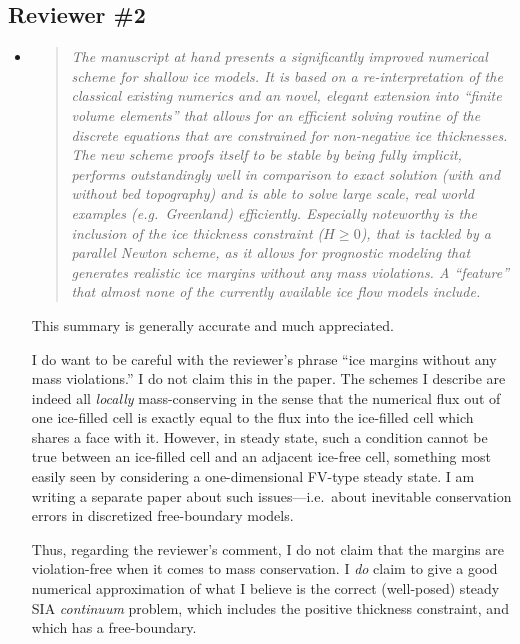 \documentclass[11pt,reqno]{amsart}
\newcommand{\reply}[2]{
\medskip\medskip
\item  \begin{quote}
\emph{#1}
\end{quote}

\medskip
\noindent #2}
\begin{document}
\subsection*{Reviewer \#2}  \begin{itemize}
\reply{The manuscript at hand presents a significantly improved numerical scheme for shallow ice models. It is based on a re-interpretation of the classical existing numerics and an novel, elegant extension into ``finite volume elements'' that allows for an efficient solving routine of the discrete equations that are constrained for non-negative ice thicknesses. The new scheme proofs itself to be stable by being fully implicit, performs outstandingly well in comparison to exact solution (with and without bed topography) and is able to solve large scale, real world examples (e.g.~Greenland) efficiently. Especially noteworthy is the inclusion of the ice thickness constraint ($H\ge 0$), that is tackled by a parallel Newton scheme, as it allows for prognostic modeling that generates realistic ice margins without any mass violations.  A ``feature'' that almost none of the currently available ice flow models include.}
{This summary is generally accurate and much appreciated.

I do want to be careful with the reviewer's phrase ``ice margins without any mass violations.''  I do not claim this in the paper.  The schemes I describe are indeed all \emph{locally} mass-conserving in the sense that the numerical flux out of one ice-filled cell is exactly equal to the flux into the ice-filled cell which shares a face with it.  However, in steady state, such a condition cannot be true between an ice-filled cell and an adjacent ice-free cell, something most easily seen by considering a one-dimensional FV-type steady state.  I am writing a separate paper about such issues---i.e.~about inevitable conservation errors in discretized free-boundary models.

Thus, regarding the reviewer's comment, I do not claim that the margins are violation-free when it comes to mass conservation.  I \emph{do} claim to give a good numerical approximation of what I believe is the correct (well-posed) steady SIA \emph{continuum} problem, which includes the positive thickness constraint, and which has a free-boundary.}


\end{itemize}
\end{document}
